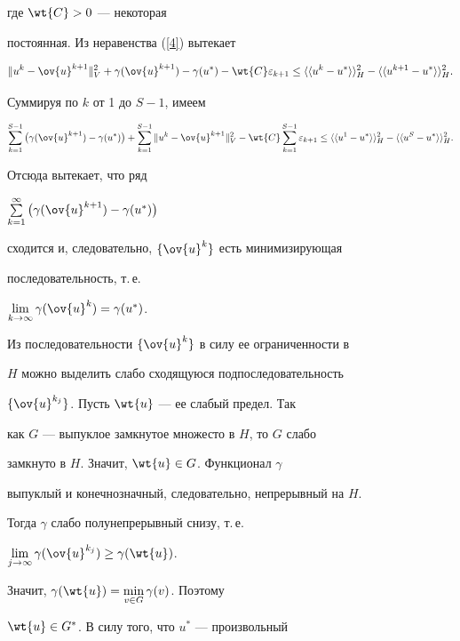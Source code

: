 где $\wt{C}>0$ --- некоторая


постоянная. Из неравенства (\ref{4}) вытекает


$$


\|u^{k}-\ov{u}^{k+1}\|^2_V+\gamma(\ov{u}^{k+1})-


\gamma(u^*)-\wt{C}\varepsilon_{k+1}


\le \la\la u^k-u^*\ra\ra ^2_H-\la\la u^{k+1}-u^*\ra\ra ^2_H.


$$


Суммируя по $k$ от 1 до $S-1$, имеем


$$


\sum\limits_{k=1}^{S-1}\big(\gamma(\ov{u}^{k+1})-\gamma(u^*)\big)+


\sum\limits_{k=1}^{S-1}\|u^{k}-\ov{u}^{k+1}\|^2_V- \wt{C}


\sum\limits_{k=1}^{S-1}\varepsilon_{k+1}\le


\la\la u^1-u^*\ra\ra ^2_H-\la\la u^S-u^*\ra\ra _H^2.


$$


Отсюда вытекает, что ряд


$\sum\limits_{k=1}^{\infty}\big(\gamma(\ov{u}^{k+1})-\gamma(u^*)\big)$


сходится и, следовательно, $\{\ov{u}^k\}$ есть минимизирующая


последовательность, т.\,е.


$\lim\limits_{k\to\infty}\gamma(\ov{u}^k)=\gamma(u^*)$.





Из последовательности $\{\ov{u}^k\}$ в силу ее ограниченности в


$H$ можно выделить слабо сходящуюся подпоследовательность


$\{\ov{u}^{k_j}\}$. Пусть $\wt{u}$ --- ее слабый предел. Так


как $G$ --- выпуклое замкнутое множесто в $H$, то $G$ слабо


замкнуто в $H$. Значит, $\wt{u}\in G$. Функционал $\gamma$


выпуклый и конечнозначный, следовательно, непрерывный на $H$.


Тогда $\gamma$ слабо полунепрерывный снизу, т.\,е.


$\lim\limits_{j\to\infty}\gamma(\ov{u}^{k_j})\ge\gamma(\wt{u})$.


Значит, $\gamma(\wt{u})=\min\limits_{v\in G}\gamma(v)$. Поэтому


$\wt{u}\in G^*$. В силу того, что $u^*$ --- произвольный


